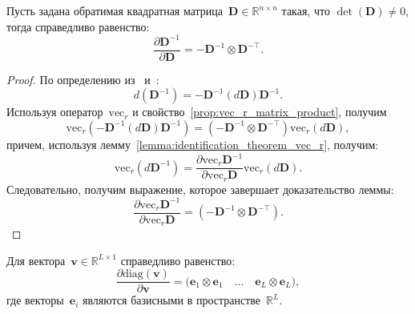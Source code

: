 \begin{lemma}\label{lemma:invert_derivative}
    Пусть задана обратимая квадратная матрица~$\mathbf{D} \in \mathbb{R}^{n \times n}$ такая, что $\det(\mathbf{D}) \neq 0$, тогда справедливо равенство:
    \begin{equation}
        \frac{\partial \mathbf{D}^{-1}}{\partial \mathbf{D}}
        = -\mathbf{D}^{-1} \otimes \mathbf{D}^{-\top}.
    \end{equation}
\end{lemma}
\begin{proof}
    По определению из~\cite{petersen2012matrix} и~\cite{magnus1988matrix}:
    \begin{equation}
        d(\mathbf{D}^{-1}) = -\mathbf{D}^{-1} (d\mathbf{D}) \mathbf{D}^{-1}.
    \end{equation}
    Используя оператор~$\mathrm{vec}_r$ и свойство~\ref{prop:vec_r_matrix_product}, получим
    \begin{equation}
        \mathrm{vec}_r(-\mathbf{D}^{-1} (d\mathbf{D}) \mathbf{D}^{-1}) = (-\mathbf{D}^{-1} \otimes \mathbf{D}^{-\top}) \mathrm{vec}_r(d\mathbf{D}),
    \end{equation}
    причем, используя лемму~\ref{lemma:identification_theorem_vec_r}, получим:
    \begin{equation}
        \mathrm{vec}_r(d\mathbf{D}^{-1}) = \frac{\partial \mathrm{vec}_r \mathbf{D}^{-1}}{\partial\mathrm{vec}_r\mathbf{D}} \mathrm{vec}_r(d\mathbf{D}).
    \end{equation}
    Следовательно, получим выражение, которое завершает доказательство леммы:
    \begin{equation}
        \frac{\partial \mathrm{vec}_r \mathbf{D}^{-1}}{\partial\mathrm{vec}_r\mathbf{D}} = (-\mathbf{D}^{-1} \otimes \mathbf{D}^{-\top}).
    \end{equation}
\end{proof}

\begin{lemma}\label{lemma:diag_derivative}
    Для вектора~$\mathbf{v} \in \mathbb{R}^{L \times 1}$ справедливо равенство:
    \begin{equation}
        \frac{\partial \mathrm{diag}(\mathbf{v})}{\partial \mathbf{v}}
        = \big(\mathbf{e}_1 \otimes \mathbf{e}_1 \quad \dots \quad \mathbf{e}_L \otimes \mathbf{e}_L\big),
    \end{equation}
    где векторы~$\mathbf{e}_i$ являются базисными в пространстве~$\mathbb{R}^L$.
\end{lemma}

